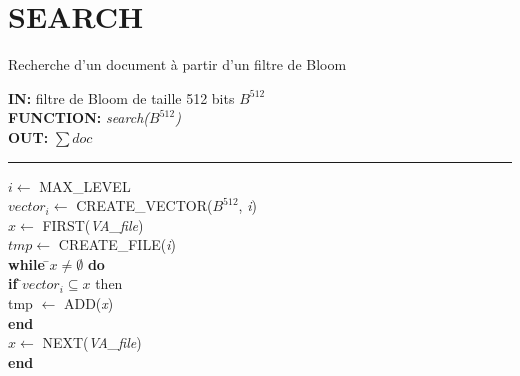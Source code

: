 \section{SEARCH}
\begin{algorithme}
	Recherche d'un document à partir d'un filtre de Bloom
\end{algorithme}

\begin{flushleft}
	\begin{framed}
		\textbf{IN:} filtre de Bloom de taille 512 bits $B^{512}$\\
		\textbf{FUNCTION:} \textit{search($B^{512}$)}\\
		\textbf{OUT:} \textit{$\sum doc$}\\

		\noindent\rule{\linewidth}{0.5pt}

		\begin{tabbing}
			$i \leftarrow$ MAX\_LEVEL\\
			$vector_i \leftarrow$ CREATE\_VECTOR($B^{512}$, \textit{i})\\
			$x \leftarrow$ FIRST(\textit{VA\_file})\\
			$tmp \leftarrow$ CREATE\_FILE(\textit{i})\\
			
			\textbf{while }\=$x \neq \emptyset $ \textbf{do}\\
					\> \textbf{if }\=$vector_i \subseteq x$ {then}\\
						\>\> tmp $\leftarrow$ ADD(\textit{x})\\
					\> \textbf{end}\\
					\> $x \leftarrow$ NEXT(\textit{VA\_file})\\
			\textbf{end}\\
			

\end{tabbing}
\end{framed}
\end{flushleft}

